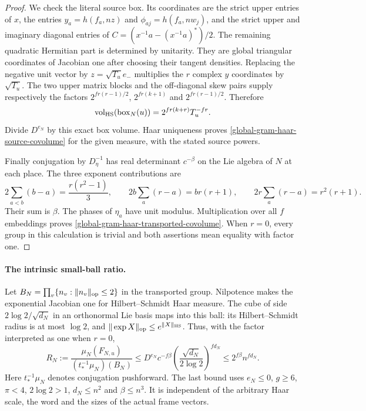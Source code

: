 \begin{proof}
We check the literal source box.  Its coordinates are the
strict upper entries of $x$, the entries
$y_a=h(f_a,nz)$ and $\phi_{aj}=h(f_a,nw_j)$, and the strict
upper and imaginary diagonal entries of
$C=(x^{-1}a-(x^{-1}a)^*)/2$.
The remaining quadratic Hermitian part is determined by
unitarity.  They are global triangular coordinates of Jacobian
one after choosing their tangent densities.  Replacing the
negative unit vector by $z=\sqrt{T_u}e_-$ multiplies the
$r$ complex $y$ coordinates by $\sqrt{T_u}$.  The two upper
matrix blocks and the off-diagonal skew pairs supply respectively
the factors
$2^{fr(r-1)/2}$, $2^{fr(k+1)}$ and
$2^{fr(r-1)/2}$.  Therefore
\[
 \operatorname{vol}_{\rm HS}(\operatorname{box}_N(u))
                         =2^{fr(k+r)}T_u^{-fr}.
\]
Divide $D^{e_N}$ by this exact box volume.  Haar uniqueness
proves \eqref{global-gram-haar-source-covolume} for the given
measure, with the stated source powers.

Finally conjugation by $D_\eta^{-1}$ has real determinant
$c^{-\beta}$ on the Lie algebra of $N$ at each place.
The three exponent contributions are
\[
 2\sum_{a<b}(b-a)=\frac{r(r^2-1)}3,\qquad
 2b\sum_a(r-a)=br(r+1),\qquad
 2r\sum_a(r-a)=r^2(r+1).
\]
Their sum is $\beta$.  The phases of $\eta_a$ have unit
modulus.  Multiplication over all $f$ embeddings proves
\eqref{global-gram-haar-transported-covolume}.
When $r=0$, every group in this calculation is trivial and
both assertions mean equality with factor one.
\end{proof}

\paragraph{The intrinsic small-ball ratio.}
Let $B_N=\prod_v\{n_v:\|n_v\|_{\rm op}\le2\}$ in the
transported group.  Nilpotence makes the exponential Jacobian
one for Hilbert--Schmidt Haar measure.  The cube of side
$2\log2/\sqrt{d_N}$ in an orthonormal Lie basis maps into
this ball: its Hilbert--Schmidt radius is at most $\log2$,
and $\|\exp X\|_{\rm op}\le e^{\|X\|_{\rm HS}}$.
Thus, with the factor interpreted as one when $r=0$,
\begin{equation}\label{global-gram-haar-ratio}
 R_N:=\frac{\mu_N(F_{N,u})}{(t^{-1}_*\mu_N)(B_N)}
 \le D^{e_N}c^{-f\beta}
           \left(\frac{\sqrt{d_N}}{2\log2}\right)^{fd_N}
 \le2^{f\beta}n^{fd_N}.
\end{equation}
Here $t^{-1}_*\mu_N$ denotes conjugation pushforward.
The last bound uses $e_N\le0$, $g\ge6$, $\pi<4$,
$2\log2>1$, $d_N\le n^2$ and $\beta\le n^3$.
It is independent of the arbitrary Haar scale, the word and
the sizes of the actual frame vectors.

